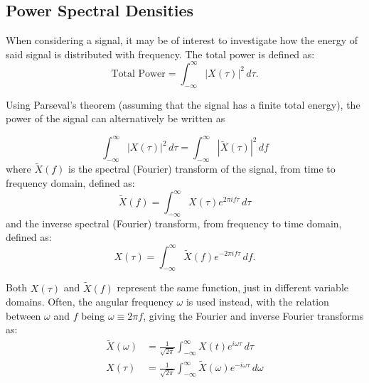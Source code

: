 \documentclass[../../CompleteThesis2/Complete_2ndDraft]{subfiles}
\begin{document}
\subsection[PSD][PSD]{Power Spectral Densities}
\label{Subsec:SignalAnalysis_BackDiffusion_SpectralAnalysis_PSD}

When considering a signal, it may be of interest to investigate how the energy of said signal is distributed with frequency. The total power is defined as:
\begin{equation}
	\text{Total Power} = \int_{-\infty}^{\infty} |X(\tau)|^2 \, d\tau.
	\label{Eq:SignalEnergy}
\end{equation}

Using Parseval's theorem \cite[M. Parseval, 1806]{Parsecal1806} (assuming that the signal has a finite total energy), the power of the signal can alternatively be written as

\begin{equation}
	\int_{-\infty}^{\infty} |X(\tau)|^2 \, d\tau = \int_{-\infty}^{\infty} |\tilde{X}(\tau)|^2\, df
	\label{Eq:ParsevalsTheorem}
\end{equation}
where $\tilde{X}(f)$ is the spectral (Fourier) transform of the signal, from time to frequency domain, defined as:
\begin{equation}
	\tilde{X}(f) = \int_{-\infty}^{\infty} X(\tau) e^{2\pi i f \tau} \, d\tau
	\label{Eq:FourierTransform}
\end{equation}
and the inverse spectral (Fourier) transform, from frequency to time domain, defined as:
\begin{equation}
	X(\tau) = \int_{-\infty}^{\infty} \tilde{X}(f) e^{-2\pi i f \tau}\, df.
	\label{Eq:InverseFourierTransform}
\end{equation}

Both $X(\tau)$ and $\tilde{X}(f)$ represent the same function, just in different variable domains. Often, the angular frequency $\omega$ is used instead, with the relation between $\omega$ and $f$ being $\omega \equiv 2\pi f $, giving the Fourier and inverse Fourier transforms as:
\begin{equation}
	\begin{aligned}
		\tilde{X}(\omega) &= \frac{1}{\sqrt{2\pi}}\int_{-\infty}^{\infty} X(t) e^{i\omega\tau}\, d\tau \\
		X(\tau) &= \frac{1}{\sqrt{2\pi}}\int_{-\infty}^{\infty} \tilde{X}(\omega) e^{-i\omega\tau}\, d\omega
		\label{Eq:FourierTransformAngular}
	\end{aligned} 
\end{equation}
\end{document}

